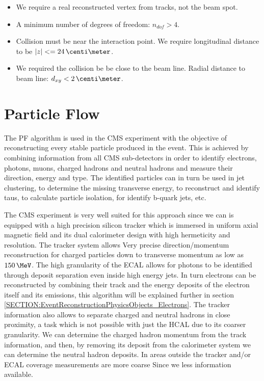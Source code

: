 \begin{itemize}
  \item We require a real reconstructed vertex from tracks, not the beam spot.
  \item A minimum number of degrees of freedom: $n_{dof}>4$.
  \item Collision must be near the interaction point. We require longitudinal distance to be $|z|<=24\,\centi\meter$.
  \item We required the collision be be close to the beam line. Radial distance to beam line: $d_{xy}<2\,\centi\meter$. 
\end{itemize}

\section{Particle Flow}
\label{SECTION:EventReconstructionPhysicsObjects_ParticleFlow}


The \gls{PF} algorithm \cite{ARTICLE:CMSComissioningOfParticleFlow, ARTICLE:CMSParticleFlowEventRecontruction, ARTICLE:CMSComissioningOfParticleFlowWithMinBias} is used in the \gls{CMS} experiment with the objective of reconstructing every stable particle produced in the event. This is achieved by combining information from all \gls{CMS} sub-detectors in order to identify electrons, photons, muons, charged hadrons and neutral hadrons and measure their direction, energy and type. The identified particles can in turn be used in jet clustering, to determine the missing transverse energy, to reconstruct and identify taus, to calculate particle isolation, for identify b-quark jets, etc.

The \gls{CMS} experiment is very well suited for this approach since we can is equipped with a high precision silicon tracker which is immersed in uniform axial magnetic field and its dual calorimeter design with high hermeticity and resolution. The tracker system allows Very precise direction/momentum reconstruction for charged particles down to transverse momentum as low as $150\,\MeV$. The high granularity of the \gls{ECAL} allows for photons to be identified through deposit separation even inside high energy jets. In turn electrons can be reconstructed by combining their track and the energy deposits of the electron itself and its emissions, this algorithm will be explained further in section \ref{SECTION:EventReconstructionPhysicsObjects_Electrons}. The tracker information also allows to separate charged and neutral hadrons in close proximity, a task which is not possible with just the \gls{HCAL} due to its coarser granularity. We can determine the charged hadron momentum from the track information, and then, by removing its deposit from the calorimeter system we can determine the neutral hadron deposits. In areas outside the tracker and/or \gls{ECAL} coverage measurements are more coarse Since we less information available.

